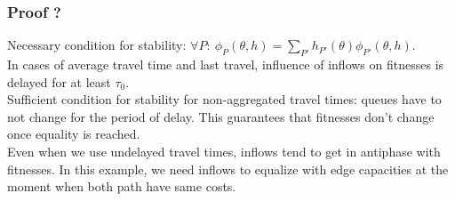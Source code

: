 \documentclass[12pt]{article}
\begin{document}
\subsubsection*{Proof ?}

Necessary condition for stability: $ \forall P: ~ \phi_P(\theta, h) = \sum_{P'} h_{P'}(\theta) \phi_{P'}(\theta, h) $. \\
In cases of average travel time and last travel, influence of inflows on fitnesses is delayed for at least $\tau_0$. \\ 

Sufficient condition for stability for non-aggregated travel times: queues have to not change for the period of delay. This guarantees that fitnesses don't change once equality is reached.
\\

Even when we use undelayed travel times, inflows tend to get in antiphase with fitnesses.
In this example, we need inflows to equalize with edge capacities at the moment when both path have same costs.
\end{document}

